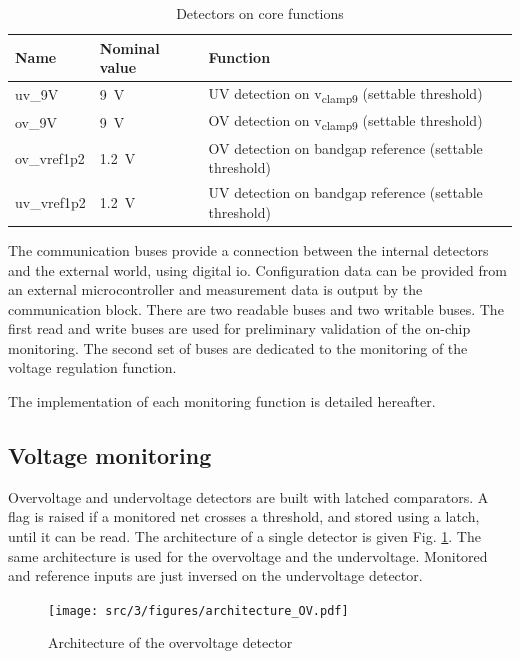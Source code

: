 \begin{table}[!htbp]
\centering
\begin{tabular}{@{}lll@{}}
\toprule
Name           & Nominal value     & Function \\ \toprule
uv\_9V	       & \SI{9}{\volt}     & UV detection on v\textsubscript{clamp9} (settable threshold)\\
ov\_9V	       & \SI{9}{\volt}     & OV detection on v\textsubscript{clamp9} (settable threshold)\\
ov\_vref1p2	   & \SI{1.2}{\volt}   & OV detection on bandgap reference (settable threshold) \\
uv\_vref1p2	   & \SI{1.2}{\volt}   & UV detection on bandgap reference (settable threshold) \\
\bottomrule
\end{tabular}
\caption{Detectors on core functions}
\label{tab:detectors}
\end{table}

The communication buses provide a connection between the internal detectors and the external world, using digital \gls{io}.
Configuration data can be provided from an external microcontroller and measurement data is output by the communication block.
There are two readable buses and two writable buses.
The first read and write buses are used for preliminary validation of the on-chip monitoring.
The second set of buses are dedicated to the monitoring of the voltage regulation function. 

The implementation of each monitoring function is detailed hereafter.

\subsection{Voltage monitoring}

Overvoltage and undervoltage detectors are built with latched comparators.
A flag is raised if a monitored net crosses a threshold, and stored using a latch, until it can be read.
The architecture of a single detector is given Fig. \ref{fig:architecture-ov}.
The same architecture is used for the overvoltage and the undervoltage.
Monitored and reference inputs are just inversed on the undervoltage detector.

\begin{figure}[!h]
  \centering
  \texttt{[image: src/3/figures/architecture\_OV.pdf]}
  \caption{Architecture of the overvoltage detector}
  \label{fig:architecture-ov}
\end{figure}


